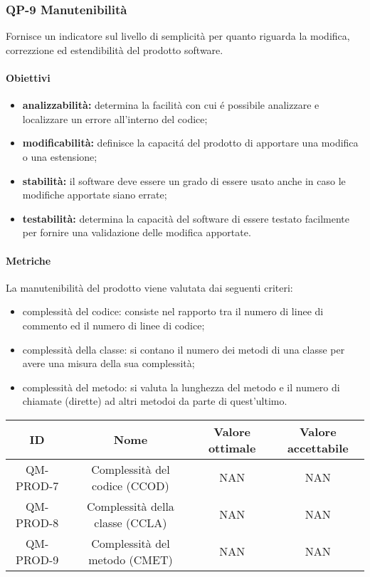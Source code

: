 \subsubsection{QP-9 Manutenibilità}
Fornisce un indicatore sul livello di semplicità per quanto riguarda la modifica, correzzione ed estendibilità del prodotto software.
	\paragraph{Obiettivi}
		\begin{itemize}
			\item \textbf{analizzabilità:} determina la facilità con cui é possibile analizzare e localizzare un errore all'interno del codice;
			\item \textbf{modificabilità:} definisce la capacitá del prodotto di apportare una modifica o una estensione;
			\item \textbf{stabilità:} il software deve essere un grado di essere usato anche in caso le modifiche apportate siano errate;
			\item \textbf{testabilità:} determina la capacità del software di essere testato facilmente per fornire una validazione delle modifica apportate.
		\end{itemize}
	\paragraph{Metriche}
	La manutenibilità del prodotto viene valutata dai seguenti criteri:
	\begin{itemize}
		\item complessità del codice: consiste nel rapporto tra il numero di linee di commento ed il numero di linee di codice;
		\item complessità della classe: si contano il numero dei metodi di una classe per avere una misura della sua complessità;
		\item complessità del metodo: si valuta la lunghezza del metodo e il numero di chiamate (dirette) ad altri metodoi da parte di quest'ultimo.
	\end{itemize}
	\begin{center}
		\begin{tabular}{|c|c|c|c|}
			\hline
			ID & Nome & Valore ottimale & Valore accettabile \\
			\hline
			QM-PROD-7 & Complessità del codice (CCOD) & NAN & NAN \\
			\hline
			QM-PROD-8 & Complessità della classe (CCLA) & NAN & NAN \\
			\hline
			QM-PROD-9 & Complessità del metodo (CMET) & NAN & NAN \\
			\hline
		\end{tabular}
	\end{center}
